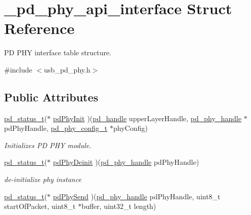 \hypertarget{struct__pd__phy__api__interface}{\section{\-\_\-pd\-\_\-phy\-\_\-api\-\_\-interface Struct Reference}
\label{struct__pd__phy__api__interface}
}


P\-D P\-H\-Y interface table structure.  




{\ttfamily \#include $<$usb\-\_\-pd\-\_\-phy.\-h$>$}

\subsection*{Public Attributes}
\begin{DoxyCompactItemize}
\item 
\hyperlink{group__usb__pd__stack_ga04a1f331d9807a70ab9bb753f5ed1c80}{pd\-\_\-status\-\_\-t}($\ast$ \hyperlink{struct__pd__phy__api__interface_a8f9666a7543d431aec266710dbc8d78c}{pd\-Phy\-Init} )(\hyperlink{group__usb__pd__stack_ga9397835347d48ef48b6b0ecba6312213}{pd\-\_\-handle} upper\-Layer\-Handle, \hyperlink{group__usb__pd__stack_gab39e13c5c0808b2fe22b7dac49db335a}{pd\-\_\-phy\-\_\-handle} $\ast$pd\-Phy\-Handle, \hyperlink{group__usb__pd__phy__drv_gab1d9a93a90c056727dcf364d6a5749e4}{pd\-\_\-phy\-\_\-config\-\_\-t} $\ast$phy\-Config)
\begin{DoxyCompactList}\small\item\em Initializes P\-D P\-H\-Y module. \end{DoxyCompactList}\item 
\hyperlink{group__usb__pd__stack_ga04a1f331d9807a70ab9bb753f5ed1c80}{pd\-\_\-status\-\_\-t}($\ast$ \hyperlink{struct__pd__phy__api__interface_a9e36ebe547c2ed82866597b2afc54bd0}{pd\-Phy\-Deinit} )(\hyperlink{group__usb__pd__stack_gab39e13c5c0808b2fe22b7dac49db335a}{pd\-\_\-phy\-\_\-handle} pd\-Phy\-Handle)
\begin{DoxyCompactList}\small\item\em de-\/initialize phy instance \end{DoxyCompactList}\item 
\hyperlink{group__usb__pd__stack_ga04a1f331d9807a70ab9bb753f5ed1c80}{pd\-\_\-status\-\_\-t}($\ast$ \hyperlink{struct__pd__phy__api__interface_ab9b74f09035836be811dc6aae682074f}{pd\-Phy\-Send} )(\hyperlink{group__usb__pd__stack_gab39e13c5c0808b2fe22b7dac49db335a}{pd\-\_\-phy\-\_\-handle} pd\-Phy\-Handle, uint8\-\_\-t start\-Of\-Packet, uint8\-\_\-t $\ast$buffer, uint32\-\_\-t length)

\end{DoxyCompactItemize}
